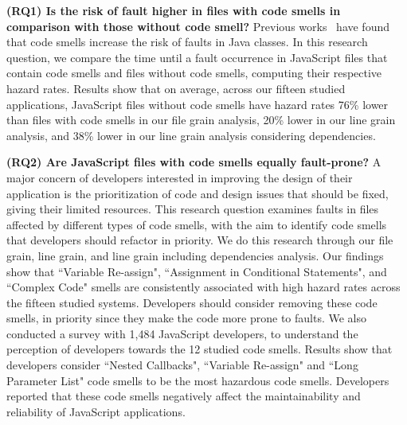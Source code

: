 \begin{sloppypar}
\textbf{(RQ1) Is the risk of fault higher in files with code smells in comparison with those without code smell?}
Previous works~\cite{Khomh2012,jaafar2013mining} have found that code smells increase the risk of faults in Java classes. In this research question, we compare the time until a fault occurrence in JavaScript files that contain code smells and files without code smells, computing their respective hazard rates. Results show that on average, across our {\color{blue}fifteen} studied applications, JavaScript files without code smells have hazard rates {\color{blue}76\%} lower than files with code smells {\color{blue}in our file grain analysis, 20\% lower in our line grain analysis, and 38\% lower in our line grain analysis considering dependencies.}
\end{sloppypar}

\textbf{(RQ2) Are JavaScript files with code smells equally fault-prone?}
A major concern of developers interested in improving the design of their application is the prioritization of code and design issues that should be fixed, giving their limited resources. This research question examines faults in files affected by different types of code smells, with the aim to identify code smells that developers should refactor in priority. {\color{blue}We do this research through our file grain, line grain, and line grain including dependencies analysis.} Our findings show that ``Variable Re-assign", ``Assignment in Conditional Statements", {\color{blue}and ``Complex Code"} smells are consistently associated with high hazard rates across the {\color{blue}fifteen} studied systems. Developers should consider removing these code smells, in priority since they make the code more prone to faults. 
We also conducted a survey with 1,484 JavaScript developers, to understand the perception of developers towards the 12 studied code smells. Results show that developers consider ``Nested Callbacks", ``Variable Re-assign" and ``Long Parameter List" code smells to be the most hazardous code smells. Developers reported that these code smells negatively affect the maintainability and reliability of JavaScript applications.

